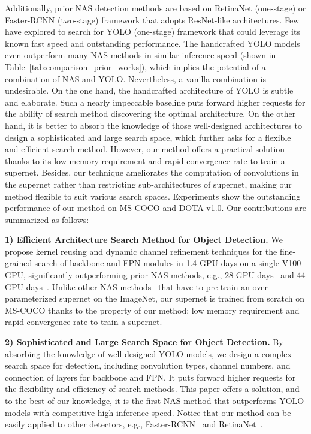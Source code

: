 \documentclass[letterpaper]{article} \usepackage{aaai22}  \usepackage{times}  \usepackage{helvet}  \usepackage{courier}  \usepackage[hyphens]{url}  \usepackage{graphicx} \urlstyle{rm} \def\UrlFont{\rm}  \usepackage{natbib}  \usepackage{caption} \DeclareCaptionStyle{ruled}{labelfont=normalfont,labelsep=colon,strut=off} \frenchspacing  \setlength{\pdfpagewidth}{8.5in}  \setlength{\pdfpageheight}{11in}
\begin{document}
Additionally, prior NAS detection methods are based on RetinaNet (one-stage) or Faster-RCNN (two-stage) framework that adopts ResNet-like architectures. Few have explored to search for YOLO (one-stage) framework that could leverage its known fast speed and outstanding performance.
The handcrafted YOLO models even outperform many NAS methods in similar inference speed (shown in Table~\ref{tab:comparison_prior_works}), which implies the potential of a combination of NAS and YOLO. Nevertheless, a vanilla combination is undesirable. On the one hand, the handcrafted architecture of YOLO is subtle and elaborate. Such a nearly impeccable baseline puts forward higher requests for the ability of search method discovering the optimal architecture. On the other hand, it is better to absorb the knowledge of those well-designed architectures to design a sophisticated and large search space, which further asks for a flexible and efficient search method.
However, our method offers a practical solution thanks to its low memory requirement and rapid convergence rate to train a supernet. Besides, our technique ameliorates the computation of convolutions in the supernet rather than restricting sub-architectures of supernet, making our method flexible to suit various search spaces.
Experiments show the outstanding performance of our method on MS-COCO and DOTA-v1.0. Our contributions are summarized as follows:






\textbf{1) Efficient Architecture Search Method for Object Detection.}
We propose kernel reusing and dynamic channel refinement techniques for the fine-grained search of backbone and FPN modules in 1.4 GPU-days on a single V100 GPU, significantly outperforming prior NAS methods, e.g., 28 GPU-days~\cite{wang2020fcos} and 44 GPU-days~\cite{chen2019detnas}. Unlike other NAS methods~\cite{chen2019detnas,yao2020sm,hit_detector} that have to pre-train an over-parameterized supernet on the ImageNet, our supernet is trained from scratch on MS-COCO thanks to the property of our method: low memory requirement and rapid convergence rate to train a supernet.




\textbf{2) Sophisticated and Large Search Space for Object Detection.}
By absorbing the knowledge of well-designed YOLO models, we design a complex search space for detection, including convolution types, channel numbers, and connection of layers for backbone and FPN. It puts forward higher requests for the flexibility and efficiency of search methods. This paper offers a solution, and to the best of our knowledge, it is the first NAS method that outperforms YOLO models with competitive high inference speed.
Notice that our method can be easily applied to other detectors, e.g., Faster-RCNN~\cite{faster_rcnn} and RetinaNet~\cite{retinanet}.
\end{document}
